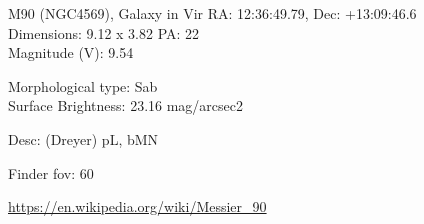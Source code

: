 \begin{block}{M90 (NGC4569), Galaxy in Vir}
    RA: 12:36:49.79, Dec: +13:09:46.6 \\ 
    Dimensions: 9.12 x 3.82 PA: 22 \\ 
    Magnitude (V): 9.54

    Morphological type: Sab \\ 
    Surface Brightness: 23.16 mag/arcsec2 

    Desc: (Dreyer) pL, bMN 

    Finder fov: 60 

    \url{https://en.wikipedia.org/wiki/Messier_90} 
\end{block}